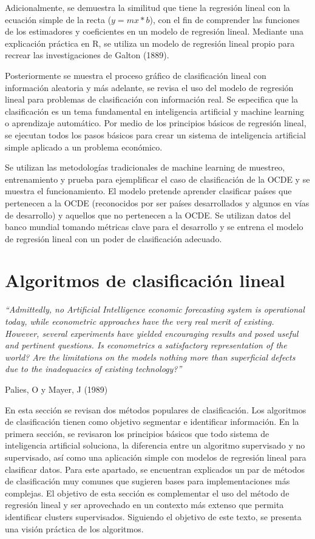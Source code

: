 \documentclass[letterpaper,12pt, spanish, oneside]{book} %
\begin{document}
Adicionalmente, se demuestra la similitud que tiene la regresión lineal con la ecuación simple de la recta ($y =mx * b$), con el fin de comprender las funciones de los estimadores y coeficientes en un modelo de regresión lineal. Mediante una explicación práctica en R, se utiliza un modelo de regresión lineal propio para recrear las investigaciones de Galton (1889). 

Posteriormente se muestra el proceso gráfico de clasificación lineal con información aleatoria y más adelante, se revisa el uso del modelo de regresión lineal para problemas de clasificación con información real. Se especifica que la clasificación es un tema fundamental en inteligencia artificial y machine learning o aprendizaje automático. Por medio de los principios básicos de regresión lineal, se ejecutan todos los pasos básicos para crear un sistema de inteligencia artificial simple aplicado a un problema económico. 

Se utilizan las metodologías tradicionales de machine learning de muestreo, entrenamiento y prueba para ejemplificar el caso de clasificación de la OCDE y se muestra el funcionamiento. El modelo pretende aprender clasificar países que pertenecen a la OCDE (reconocidos por ser países desarrollados y algunos en vías de desarrollo) y aquellos que no pertenecen a la OCDE. Se utilizan datos del banco mundial tomando métricas clave para el desarrollo y se entrena el modelo de regresión lineal con un poder de clasificación adecuado. 


\chapter{Algoritmos de clasificación lineal}

\begin{flushright}
\textit{“Admittedly, no Artificial Intelligence economic forecasting system is operational today, while econometric approaches have the very real merit of existing. However, several experiments have yielded encouraging results and posed useful and pertinent questions. Is econometrics a satisfactory representation of the world? Are the limitations on the models nothing more than superficial defects due to the inadequacies of existing technology?”}

Palies, O y Mayer,  J (1989)
\end{flushright}

En esta sección se revisan dos métodos populares de clasificación. Los algoritmos de clasificación tienen como objetivo segmentar e identificar información. En la primera sección, se revisaron los principios básicos que todo sistema de inteligencia artificial soluciona, la diferencia entre un algoritmo supervisado y no supervisado, así como una aplicación simple con modelos de regresión lineal para clasificar datos. Para este apartado, se encuentran explicados un par de métodos de clasificación muy comunes que sugieren bases para implementaciones más complejas. El objetivo de esta sección es complementar el uso del método de regresión lineal y ser aprovechado en un contexto más extenso que permita identificar clusters supervisados. Siguiendo el objetivo de este texto, se presenta una visión práctica de los algoritmos. 
\end{document}
